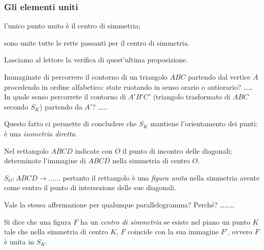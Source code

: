 \subsubsection{Gli elementi uniti}

\begin{itemize*}
\item l'unico punto unito è il centro di simmetria;
\item sono unite tutte le rette passanti per il centro di simmetria.
\end{itemize*}
Lasciamo al lettore la verifica di quest'ultima 
proposizione.\vspace{8pt}

Immaginate di percorrere il contorno di un triangolo \(ABC\) partendo 
dal vertice \(A\) procedendo in ordine alfabetico: state ruotando in 
senso orario o antiorario? \ldots\ldots{} In quale senso percorrete 
il contorno di \(A'B'C'\) (triangolo trasformato di \(ABC\) secondo 
\(S_K\)) partendo da \(A'\)? \ldots\ldots{}

Questo fatto ci permette di concludere che \(S_K\) mantiene 
l'orientamento dei punti: è una \emph{isometria diretta}.

\begin{esempio}
Nel rettangolo \(ABCD\) indicate con \(O\) il punto di incontro delle 
diagonali; determinate l'immagine di \(ABCD\) nella simmetria di centro 
\(O\).

\(S_O:ABCD \rightarrow \ldots\ldots{}\) pertanto il rettangolo è una 
\emph{figura unita} nella simmetria avente come centro il punto di 
intersezione delle sue diagonali.

\begin{figure*}[!htb]
    \centering
\end{figure*}

Vale la stessa affermazione per qualunque parallelogramma? Perché? 
\ldots\ldots\ldots{}

\begin{figure*}[!htb]
    \centering
\end{figure*}

\end{esempio}

\begin{definizione}
Si dice che una figura \(F\) ha un \emph{centro di simmetria} se esiste 
nel piano un punto \(K\) tale che nella simmetria di centro \(K\), \(F\) 
coincide con la sua immagine \(F'\), ovvero \(F\) è unita in \(S_K\). 
\end{definizione}

